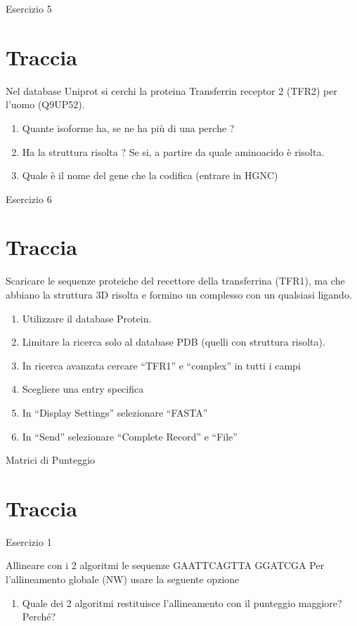 \documentclass{article}
\begin{document}
\begin{center}
   \huge
   Esercizio 5
\end{center}
\section*{Traccia}
Nel database Uniprot si cerchi la proteina Transferrin receptor 2 (TFR2) per l’uomo (Q9UP52).
\begin{enumerate}
   \item Quante isoforme ha, se ne ha più di una perche ?
   \item Ha la struttura risolta ? Se si, a partire da quale aminoacido è risolta.
   \item Quale è il nome del gene che la codifica (entrare in HGNC)
\end{enumerate}

\begin{center}
   \huge
   Esercizio 6
\end{center}
\section*{Traccia}
Scaricare le sequenze proteiche del recettore della transferrina (TFR1), ma che abbiano la struttura 3D risolta e formino un complesso con un qualsiasi ligando.
\begin{enumerate}
   \item Utilizzare il database Protein.
   \item Limitare la ricerca solo al database PDB (quelli con struttura risolta).
   \item In ricerca avanzata cercare “TFR1” e “complex” in tutti i campi
   \item Scegliere una entry specifica
   \item In “Display Settings” selezionare “FASTA”
   \item In “Send” selezionare “Complete Record” e “File”
\end{enumerate}

\begin{center}
   \Huge
   Matrici di Punteggio
\end{center}
\section*{Traccia}
\begin{center}
   \huge
   Esercizio 1
\end{center}

Allineare con i 2 algoritmi le sequenze
GAATTCAGTTA
GGATCGA
Per l’allineamento globale (NW) usare la seguente opzione
\begin{enumerate}
   \item Quale dei 2 algoritmi restituisce l’allineamento con il punteggio maggiore? Perché?
\end{enumerate}
\end{document}

